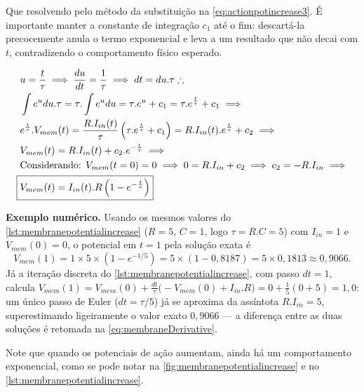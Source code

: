 			\par Que resolvendo pelo método da substituição na \autoref{eq:actionpotincrease3}. É importante manter a constante de integração $c_1$ até o fim: descartá-la precocemente anula o termo exponencial e leva a um resultado que não decai com $t$, contradizendo o comportamento físico esperado.
			
			\begin{equation}
				\label{eq:actionpotincrease3}
				\begin{aligned}
					&u=\frac{t}{\tau} \implies \dfrac{du}{dt} = \dfrac{1}{\tau} \implies dt = du.\tau \therefore \\
					&\int e^u du.\tau = \tau.\int e^u du = \tau . e^u + c_1 = \tau . e^{\frac{t}{\tau}} + c_1 \implies \\
					&e^{\frac{t}{\tau}}.V_{mem}(t) = \frac{R.I_{in}(t)}{\tau}\left(\tau.e^{\frac{t}{\tau}} + c_1\right) = R.I_{in}(t).e^{\frac{t}{\tau}} + c_2 \implies \\
					&V_{mem}(t) = R.I_{in}(t) + c_2.e^{-\frac{t}{\tau}} \implies \\
					& \text{Considerando: } V_{mem}(t=0) = 0 \implies 0 = R.I_{in} + c_2 \implies c_2 = -R.I_{in} \implies \\
					\Aboxed{&V_{mem}(t) = I_{in}(t).R\left(1-e^{-\frac{t}{\tau}}\right)}
				\end{aligned}
			\end{equation}
			
			
			\par \textbf{Exemplo numérico.} Usando os mesmos valores do \autoref{lst:membranepotentialincrease} ($R=5$, $C=1$, logo $\tau=R.C=5$) com $I_{in}=1$ e $V_{mem}(0)=0$, o potencial em $t=1$ pela solução exata é
			\begin{equation*}
				V_{mem}(1) = 1 \times 5 \times \left(1-e^{-1/5}\right) = 5 \times (1-0{,}8187) = 5 \times 0{,}1813 \approx 0{,}9066.
			\end{equation*}
			Já a iteração discreta do \autoref{lst:membranepotentialincrease}, com passo $dt=1$, calcula $V_{mem}(1) = V_{mem}(0) + \frac{dt}{\tau}\big(-V_{mem}(0) + I_{in}.R\big) = 0 + \frac{1}{5}(0+5) = 1{,}0$: um único passo de Euler ($dt=\tau/5$) já se aproxima da assíntota $R.I_{in}=5$, superestimando ligeiramente o valor exato $0{,}9066$ --- a diferença entre as duas soluções é retomada na \autoref{eq:membraneDerivative}.

			\par Note que quando os potenciais de ação aumentam, ainda há um comportamento exponencial, como se pode notar na   \autoref{fig:membranepotentialincrease} e no  \autoref{lst:membranepotentialincrease}.
			
